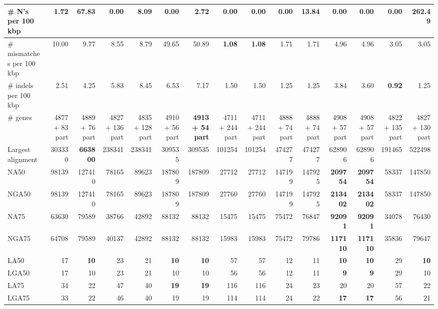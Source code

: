 \documentclass[12pt,a4paper]{article}
\begin{document}
\begin{table}[ht]
\begin{center}
\begin{tabular}{|l*{14}{|r}|}
\# N's per 100 kbp & 1.72 & 67.83 & {\bf 0.00} & 8.09 & {\bf 0.00} & 2.72 & {\bf 0.00} & {\bf 0.00} & {\bf 0.00} & 13.84 & {\bf 0.00} & {\bf 0.00} & {\bf 0.00} & 262.49 \\ \hline
\# mismatches per 100 kbp & 10.00 & 9.77 & 8.55 & 8.79 & 49.65 & 50.89 & {\bf 1.08} & {\bf 1.08} & 1.71 & 1.71 & 4.96 & 4.96 & 3.05 & 3.05 \\ \hline
\# indels per 100 kbp & 2.51 & 4.25 & 5.83 & 8.45 & 6.53 & 7.17 & 1.50 & 1.50 & 1.25 & 1.25 & 3.84 & 3.60 & {\bf 0.92} & 1.25 \\ \hline
\# genes & 4877 + 83 part & 4889 + 76 part & 4827 + 136 part & 4835 + 128 part & 4910 + 56 part & {\bf 4913 + 54 part} & 4711 + 244 part & 4711 + 244 part & 4888 + 74 part & 4888 + 74 part & 4908 + 57 part & 4908 + 57 part & 4822 + 135 part & 4827 + 130 part \\ \hline
Largest alignment & 303330 & {\bf 663800} & 238341 & 238341 & 309535 & 309535 & 101254 & 101254 & 474277 & 474277 & 628906 & 628906 & 191465 & 522498 \\ \hline
NA50 & 98139 & 127410 & 78165 & 89623 & 187809 & 187809 & 27712 & 27712 & 147199 & 147925 & {\bf 209754} & {\bf 209754} & 58337 & 147850 \\ \hline
NGA50 & 98139 & 127410 & 78165 & 89623 & 187809 & 187809 & 27760 & 27760 & 147199 & 147925 & {\bf 213402} & {\bf 213402} & 58337 & 147850 \\ \hline
NA75 & 63630 & 79589 & 38766 & 42892 & 88132 & 88132 & 15475 & 15475 & 75472 & 76847 & {\bf 92091} & {\bf 92091} & 34078 & 76430 \\ \hline
NGA75 & 64708 & 79589 & 40137 & 42892 & 88132 & 88132 & 15983 & 15983 & 75472 & 79786 & {\bf 117110} & {\bf 117110} & 35836 & 79647 \\ \hline
LA50 & 17 & {\bf 10} & 23 & 21 & {\bf 10} & {\bf 10} & 57 & 57 & 12 & 11 & {\bf 10} & {\bf 10} & 29 & {\bf 10} \\ \hline
LGA50 & 17 & 10 & 23 & 21 & 10 & 10 & 56 & 56 & 12 & 11 & {\bf 9} & {\bf 9} & 29 & 10 \\ \hline
LA75 & 34 & 22 & 47 & 40 & {\bf 19} & {\bf 19} & 116 & 116 & 24 & 23 & 20 & 20 & 57 & 22 \\ \hline
LGA75 & 33 & 22 & 46 & 40 & 19 & 19 & 114 & 114 & 24 & 22 & {\bf 17} & {\bf 17} & 56 & 21 \\ \hline
\end{tabular}
\end{center}
\end{table}
\end{document}
